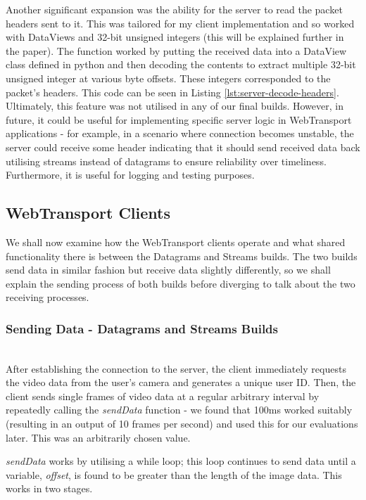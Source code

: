 Another significant expansion was the ability for the server to read the packet headers sent to it. This was tailored for my client implementation and so worked with DataViews and 32-bit unsigned integers (this will be explained further in the paper). The function worked by putting the received data into a DataView class defined in python and then decoding the contents to extract multiple 32-bit unsigned integer at various byte offsets. These integers corresponded to the packet's headers. This code can be seen in Listing \ref{lst:server-decode-headers}. Ultimately, this feature was not utilised in any of our final builds. However, in future, it could be useful for implementing specific server logic in WebTransport applications - for example, in a scenario where connection becomes unstable, the server could receive some header indicating that it should send received data back utilising streams instead of datagrams to ensure reliability over timeliness. Furthermore, it is useful for logging and testing purposes.

\subsection{WebTransport Clients}

We shall now examine how the WebTransport clients operate and what shared functionality there is between the Datagrams and Streams builds. The two builds send data in similar fashion but receive data slightly differently, so we shall explain the sending process of both builds before diverging to talk about the two receiving processes.
\hfill\\
\subsubsection{Sending Data - Datagrams and Streams Builds}
\hfill\\
After establishing the connection to the server, the client immediately requests the video data from the user's camera and generates a unique user ID. Then, the client sends single frames of video data at a regular arbitrary interval by repeatedly calling the \textit{sendData} function - we found that 100ms worked suitably (resulting in an output of 10 frames per second) and used this for our evaluations later. This was an arbitrarily chosen value. 

\textit{sendData} works by utilising a while loop; this loop continues to send data until a variable, \textit{offset}, is found to be greater than the length of the image data. This works in two stages.

